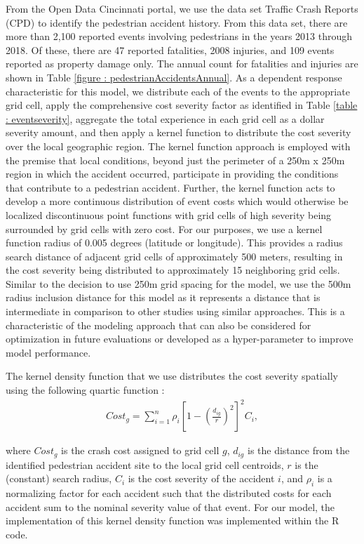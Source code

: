 \documentclass{llncs}
\begin{document}
From the Open Data Cincinnati portal, we use the data set Traffic Crash Reports (CPD) to identify the pedestrian accident history. From this data set, there are more than 2,100 reported events involving pedestrians in the years 2013 through 2018. Of these, there are 47 reported fatalities, 2008 injuries, and 109 events reported as property damage only. The annual count for fatalities and injuries are shown in Table \ref{figure : pedestrianAccidentsAnnual}. As a dependent response characteristic for this model, we distribute each of the events to the appropriate grid cell, apply the comprehensive cost severity factor as identified in Table \ref{table : eventseverity}, aggregate the total experience in each grid cell as a dollar severity amount, and then apply a kernel function to distribute the cost severity over the local geographic region. The kernel function approach is employed with the premise that local conditions, beyond just the perimeter of a 250m x 250m region in which the accident occurred, participate in providing the conditions that contribute to a pedestrian accident. Further, the kernel function acts to develop a more continuous distribution of event costs which would otherwise be localized discontinuous point functions with grid cells of high severity being surrounded by grid cells with zero cost. For our purposes, we use a kernel function radius of 0.005 degrees (latitude or longitude). This provides a radius search distance of adjacent grid cells of approximately 500 meters, resulting in the cost severity being distributed to approximately 15 neighboring grid cells.  Similar to the decision to use 250m grid spacing for the model, we use the 500m radius inclusion distance for this model as it represents a distance that is intermediate in comparison to other studies using similar approaches. This is a characteristic of the modeling approach that can also be considered for optimization in future evaluations or developed as a hyper-parameter to improve model performance.

The kernel density function that we use distributes the cost severity spatially using the following quartic function\cite{xie2017analysis} : 
\begin{align}
Cost_{g} = \sum_{i=1}^{n} \rho_{i} \left [ 1 - \left ( \frac{d_{ig}}{r} \right )^{2} \right ]^{2}C_{i},
\end{align}

where $Cost_{g}$ is the crash cost assigned to grid cell $g$, $d_{ig}$    is the distance from the identified pedestrian accident site to the local grid cell centroids, $r$ is the (constant) search radius, $C_{i}$ is the cost severity of the accident ${i}$, and $\rho_{i}$ is a normalizing factor for each accident such that the distributed costs for each accident sum to the nominal severity value of that event. For our model, the implementation of this kernel density function was implemented within the R code.
\end{document}
